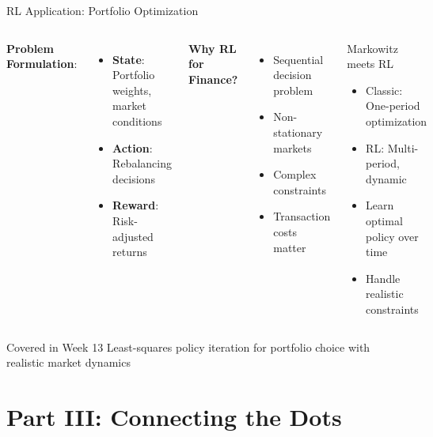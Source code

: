 \documentclass[aspectratio=169,11pt]{beamer}
\begin{document}
\begin{frame}{RL Application: Portfolio Optimization}
\begin{columns}
\textbf{Problem Formulation}:
\begin{itemize}
    \item \textbf{State}: Portfolio weights, market conditions
    \item \textbf{Action}: Rebalancing decisions
    \item \textbf{Reward}: Risk-adjusted returns
\end{itemize}

\vspace{0.5em}
\textbf{Why RL for Finance?}
\begin{itemize}
    \item Sequential decision problem
    \item Non-stationary markets
    \item Complex constraints
    \item Transaction costs matter
\end{itemize}

\begin{block}{Markowitz meets RL}
\begin{itemize}
    \item Classic: One-period optimization
    \item RL: Multi-period, dynamic
    \item Learn optimal policy over time
    \item Handle realistic constraints
\end{itemize}
\end{block}
\end{columns}

\vspace{0.5em}
\begin{alertblock}{Covered in Week 13}
Least-squares policy iteration for portfolio choice with realistic market dynamics
\end{alertblock}
\end{frame}

\section{Part III: Connecting the Dots}
\end{document}
